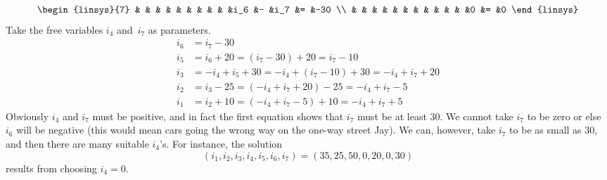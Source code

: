 \begin{exercises}
\begin{answer}
\begin{exparts}
\begin{equation*}
\begin{linsys}{7}
                  &  &    &  &    &  &    &  &    &  &i_6 &- &i_7 &= &-30 \\
                  &  &    &  &    &  &    &  &    &  &    &  &0   &= &0   
            \end{linsys}
          \end{equation*}
          Take the free variables $i_4$ and~$i_7$ as 
          parameters.
          \begin{equation*}
          \begin{split}
            i_6  &=  i_7-30  \\
            i_5  &=  i_6+20=(i_7-30)+20=i_7-10 \\
            i_3  &=  -i_4+i_5+30=-i_4+(i_7-10)+30=-i_4+i_7+20 \\
            i_2  &=  i_3-25=(-i_4+i_7+20)-25=-i_4+i_7-5 \\
            i_1  &=  i_2+10=(-i_4+i_7-5)+10=-i_4+i_7+5
          \end{split}
          \end{equation*}
          Obviously $i_4$ and $i_7$ must be positive, and in fact
          the first equation shows that $i_7$ must be at least $30$.
        \partsitem We cannot take $i_7$ to be zero or else $i_6$ will
          be negative (this would mean cars going the wrong way on the
          one-way street Jay).
          We can, however, take $i_7$ to be as small as $30$, and then 
          there are many suitable $i_4$'s.
          For instance, the solution
          \begin{equation*}
            (i_1,i_2,i_3,i_4,i_5,i_6,i_7)
            =
            (35,25,50,0,20,0,30)
          \end{equation*}
          results from choosing $i_4=0$.
      \end{exparts}
    \end{answer}
\end{exercises}
\endinput
